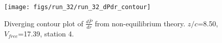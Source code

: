 \begin{figure}[H]
\centering
\texttt{[image: figs/run\_32/run\_32\_dPdr\_contour]}
\caption{Diverging contour plot of $\frac{d\bar{P}}{dr}$ from non-equilibrium theory. $z/c$=8.50, $V_{free}$=17.39, station 4.}
\label{fig:run_32_dPdr_contour}
\end{figure}


